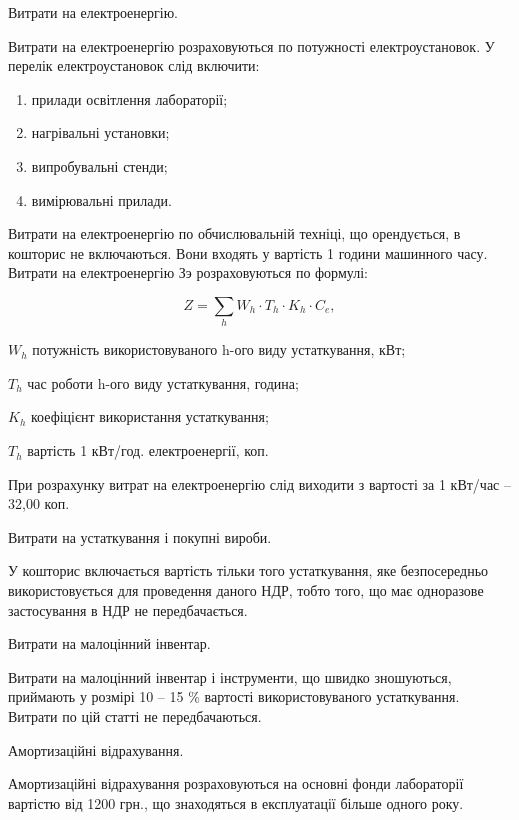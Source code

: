 Витрати на електроенергію. 

Витрати на електроенергію розраховуються по потужності електроустановок. У перелік електроустановок слід включити:
\begin{enumerate}
\item прилади освітлення лабораторії;
\item нагрівальні установки;
\item випробувальні стенди;
\item вимірювальні прилади.
\end{enumerate}

Витрати на електроенергію по обчислювальній техніці, що орендується, в кошторис не включаються. Вони входять у вартість 1 години машинного часу. Витрати на електроенергію Зэ розраховуються по формулі:

\begin{equation}
Z =  \sum \limits_{h} W_h   \cdot   T_h   \cdot   K_h   \cdot   C_e, \nonumber
\end{equation}
\begin{formulaDescription}
\item [$W_h$] потужність використовуваного h-ого виду устаткування, кВт;
\item [$T_h$] час роботи h-ого виду устаткування, година;
\item [$K_h$] коефіцієнт використання устаткування;
\item [$T_h$] вартість 1 кВт/год. електроенергії, коп.
\end{formulaDescription}

При розрахунку витрат на електроенергію слід виходити з вартості за 1 кВт/час – 32,00 коп.

Витрати на устаткування і покупні вироби. 

У кошторис включається вартість тільки того устаткування, яке безпосередньо використовується для проведення даного НДР, тобто того, що має одноразове застосування в НДР не передбачається.

Витрати на малоцінний інвентар. 

Витрати на малоцінний інвентар і інструменти, що швидко зношуються, приймають у розмірі 10 – 15 \% вартості використовуваного устаткування. Витрати по цій статті не передбачаються.

Амортизаційні відрахування.

Амортизаційні відрахування розраховуються на основні фонди лабораторії вартістю від 1200 грн., що знаходяться в експлуатації більше одного року.

